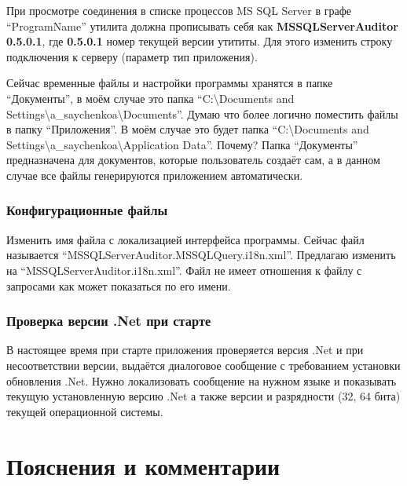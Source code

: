 При просмотре соединения в списке процессов MS SQL Server в графе ``ProgramName'' утилита должна
прописывать себя как \textbf{MSSQLServerAuditor} \textbf{0.5.0.1}, где \textbf{0.5.0.1} номер
текущей версии утититы. Для этого изменить строку подключения к серверу (параметр тип приложения).

\bigskip

Сейчас временные файлы и настройки программы хранятся в папке ``Документы'', в моём случае это папка
``C:{\textbackslash}Docu\-ments and
Set\-tings{\textbackslash}a\_sayche\-nkoa{\textbackslash}Docu\-ments''. Думаю что более логично
поместить файлы в папку ``Приложения''. В моём случае это будет папка
``C:{\textbackslash}Docu\-ments and
Set\-tings{\textbackslash}a\_sayche\-nkoa{\textbackslash}Appli\-cation Data''. Почему? Папка
``Документы'' предназначена для документов, которые пользователь создаёт сам, а в данном случае все
файлы генерируются приложением автоматически.

\subsubsection{Конфигурационные файлы}

Изменить имя файла с локализацией интерфейса программы. Сейчас файл называется
``MSSQL\-Server\-Auditor.\-MSSQLQuery.\-i18n.\-xml''. Предлагаю изменить на
``MSSQL\-Server\-Auditor.\-i18n.\-xml''. Файл не имеет отношения к файлу с запросами как может
показаться по его имени.

\subsubsection{Проверка версии .Net при старте}

В настоящее время при старте приложения проверяется версия .Net и при несоответствии версии,
выдаётся диалоговое сообщение с требованием установки обновления .Net. Нужно локализовать сообщение
на нужном языке и показывать текущую установленную версию .Net а также версии и разрядности (32, 64
бита) текущей операционной системы.

\section{Пояснения и комментарии}


